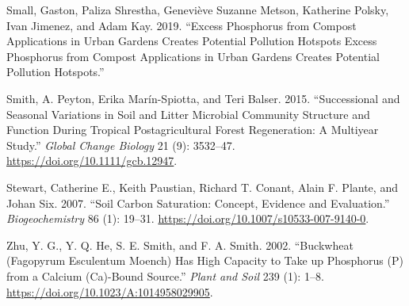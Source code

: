 \documentclass[
]{article}
\newlength{\cslhangindent}
\newlength{\cslentryspacingunit} %
\newenvironment{CSLReferences}[2] %
 {%
  \setlength{\parindent}{0pt}
  \ifodd #1
  \let\oldpar\par
  \def\par{\hangindent=\cslhangindent\oldpar}
  \fi
  \setlength{\parskip}{#2\cslentryspacingunit}
 }%
 {}
\begin{document}
\begin{CSLReferences}{1}{0}
\leavevmode{}%
Small, Gaston, Paliza Shrestha, Geneviève Suzanne Metson, Katherine Polsky, Ivan Jimenez, and Adam Kay. 2019. {``Excess Phosphorus from Compost Applications in Urban Gardens Creates Potential Pollution Hotspots {Excess} Phosphorus from Compost Applications in Urban Gardens Creates Potential Pollution Hotspots.''}

\leavevmode{}%
Smith, A. Peyton, Erika Marín-Spiotta, and Teri Balser. 2015. {``Successional and Seasonal Variations in Soil and Litter Microbial Community Structure and Function During Tropical Postagricultural Forest Regeneration: {A} Multiyear Study.''} \emph{Global Change Biology} 21 (9): 3532--47. \url{https://doi.org/10.1111/gcb.12947}.

\leavevmode{}%
Stewart, Catherine E., Keith Paustian, Richard T. Conant, Alain F. Plante, and Johan Six. 2007. {``Soil Carbon Saturation: Concept, Evidence and Evaluation.''} \emph{Biogeochemistry} 86 (1): 19--31. \url{https://doi.org/10.1007/s10533-007-9140-0}.

\leavevmode{}%
Zhu, Y. G., Y. Q. He, S. E. Smith, and F. A. Smith. 2002. {``Buckwheat ({Fagopyrum} Esculentum {Moench}) Has High Capacity to Take up Phosphorus ({P}) from a Calcium ({Ca})-Bound Source.''} \emph{Plant and Soil} 239 (1): 1--8. \url{https://doi.org/10.1023/A:1014958029905}.

\end{CSLReferences}
\end{document}
